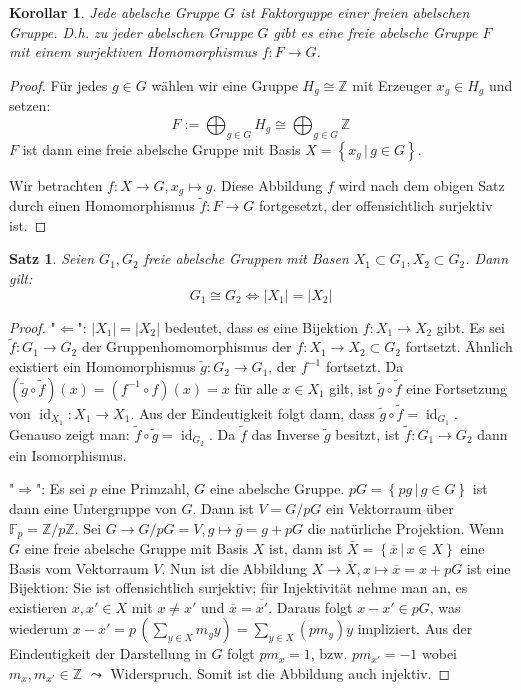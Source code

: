 \documentclass[12pt]{scrartcl} %
\newtheorem{thm}{Satz}
\newtheorem{kor}{Korollar}
\theoremstyle{definition}
\theoremstyle{remark}
\begin{document}
\begin{kor}
  Jede abelsche Gruppe $G$ ist Faktorguppe einer freien abelschen Gruppe. D.h. zu jeder abelschen Gruppe $G$ gibt es eine freie abelsche Gruppe $F$ mit einem surjektiven Homomorphismus $f: F \to G$.
\end{kor}

\begin{proof}
  Für jedes $g \in G$ wählen wir eine Gruppe $H_g \cong \mathbb{Z}$ mit Erzeuger $x_g \in H_g$ und setzen:
  \[ F := \bigoplus_{g \in G} H_g \cong \bigoplus_{g \in G} \mathbb{Z} \]
  $F$ ist dann eine freie abelsche Gruppe mit Basis $X = \left\{  x_g \,\vert\, g \in G \right\}$.

  Wir betrachten $f : X \to G, x_g \mapsto g$. Diese Abbildung $f$ wird nach dem obigen Satz durch einen Homomorphismus $\tilde{f}: F\to G$ fortgesetzt, der offensichtlich surjektiv ist.
\end{proof}

\begin{thm}
  Seien $G_1, G_2$ freie abelsche Gruppen mit Basen $X_1 \subset G_1, X_2 \subset G_2$. Dann gilt:
  \[ G_1 \cong G_2 \iff \lvert X_1 \rvert = \lvert X_2 \rvert \]
\end{thm}
\begin{proof}
  "$\Leftarrow$": $\lvert X_1 \rvert = \lvert X_2 \rvert$ bedeutet, dass es eine Bijektion $f: X_1 \to X_2$ gibt. Es sei $\tilde{f}: G_1 \to G_2 $ der Gruppenhomomorphismus der $f : X_1 \to X_2 \subset G_2$ fortsetzt.
  Ähnlich existiert ein Homomorphismus $\tilde{g}: G_2 \to G_1$, der $f^{-1}$ fortsetzt. Da $(\tilde{g} \circ \tilde{f})(x) = (f^{-1} \circ f)(x) = x $ für alle $x \in X_1$ gilt, ist $\tilde{g} \circ \tilde{f} $ eine Fortsetzung von $\operatorname{id}_{X_1} : X_1 \to X_1$. Aus der Eindeutigkeit folgt dann, dass $\tilde{g} \circ \tilde{f} = \operatorname{id}_{G_1}$. Genauso zeigt man: $\tilde{f} \circ \tilde{g} = \operatorname{id}_{G_2}$. Da $\tilde{f}$ das Inverse $\tilde{g}$ besitzt, ist $\tilde{f}: G_1 \to G_2$ dann ein Isomorphismus.

  "$\Rightarrow$": Es sei $p $ eine Primzahl, $G$ eine abelsche Gruppe. $pG = \left\{ pg \,\vert\, g \in G \right\}$ ist dann eine Untergruppe von $G$. Dann ist $V = G / pG$ ein Vektorraum über $\mathbb{F}_p = \mathbb{Z}/p\mathbb{Z}$. Sei $G \to G/pG = V, g\mapsto \overline{g} = g + pG$  die natürliche Projektion. Wenn $G$ eine freie abelsche Gruppe mit Basis $X$ ist, dann ist $ \overline{X} = \left\{ \overline{x} \,\vert\, x \in X \right\} $ eine Basis vom Vektorraum $V$. Nun ist die Abbildung $X \to \overline{X}, x \mapsto \overline{x} = x + pG$ ist eine Bijektion: Sie ist offensichtlich surjektiv; für Injektivität nehme man an, es existieren $x, x' \in X$ mit $x \neq x'$ und $\overline{x} = \overline{x'}$. Daraus folgt $ x - x' \in pG$, was wiederum $x - x' = p \, ( \sum_{y \in X} m_y y )  = \sum_{y \in X} \left( p m_y \right) y $ impliziert. Aus der Eindeutigkeit der Darstellung in $G$ folgt $p m_x = 1$, bzw. $p m_{x'} = -1$ wobei $m_x, m_{x'} \in \mathbb{Z}$ $\leadsto$  Widerspruch. Somit ist die Abbildung auch injektiv.
\end{proof}
\end{document}
